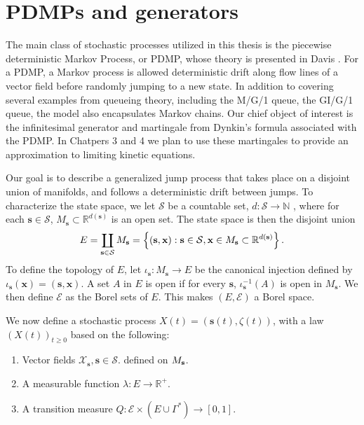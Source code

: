 

\section{PDMPs and generators} \label{pdmpgenerator}
The main class of stochastic processes utilized in this thesis is the piecewise deterministic Markov Process, or PDMP, whose theory is presented in Davis \cite{dav84}.  For a PDMP, a Markov process is allowed deterministic drift along flow lines of a vector field before randomly jumping to a new state.  In addition to covering several examples from queueing theory, including the  M/G/1 queue, the GI/G/1 queue, the model also encapsulates Markov chains.  Our chief object of interest is the infinitesimal generator and martingale from Dynkin's formula associated with the PDMP.   In Chatpers 3 and 4 we plan to use these martingales to provide an approximation to limiting kinetic equations. 


Our goal is to describe a generalized jump process that takes place on a disjoint union of  manifolds, and follows a deterministic drift between jumps. To characterize the state space, we let $\mathcal S$ be a countable set,   $d:\mathcal S\rightarrow \mathbb{N}$ , where for each $\mathbf s \in \mathcal S$,  $M_\mathbf s \subset \mathbb{R}^{d(\mathbf s)}$ is an open set.   The state space is then the disjoint union
\begin{equation}
E =\coprod_{\mathbf s \in \mathcal S} M_\mathbf s = \left\{(\mathbf s, \textbf x):\mathbf s \in \mathcal S,  \textbf x \in M_\mathbf s \subset \mathbb R^{d(\mathbf s)}\right\}. \end{equation}
To define the topology of $E$, let $\iota_\mathbf s:M_\mathbf s \rightarrow E$ be the canonical injection defined by $\iota_\mathbf s(\textbf{x}) = (\mathbf s, \textbf{x})$.  A set $A$ in $E$ is open if for every $\mathbf s$, $\iota_\mathbf s^{-1}(A)$ is open in $M_\mathbf s$. We then define $\mathcal E$ as the Borel sets of $E$. This makes $(E,\mathcal E)$ a Borel space.  

We now define a stochastic process $X(t) = (\mathbf s(t),\zeta(t))$, with a law $(X(t))_{t  \ge 0}$ based on the following:

\begin{enumerate}
\item 
Vector fields $\mathcal X_\mathbf s,\mathbf s \in \mathcal S.$ defined on $M_\textbf s$.
\item
A measurable function $\lambda:E \rightarrow \mathbb R^+$.
\item
A transition measure $Q: \mathcal E \times (E \cup \Gamma^*) \rightarrow [0,1]$.

\end{enumerate}  

